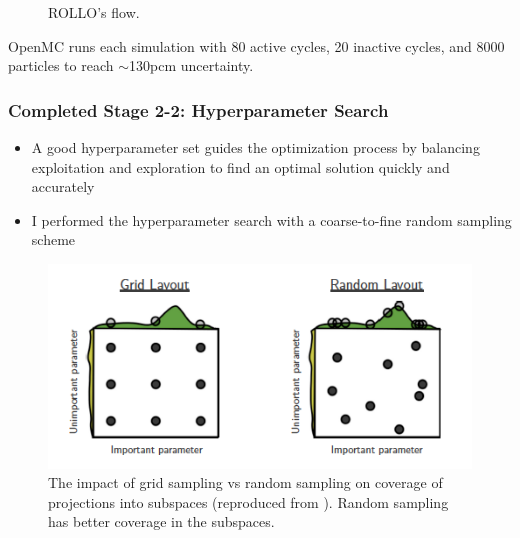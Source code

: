 \begin{frame}
\begin{minipage}[c]{0.4\textwidth}
\begin{figure}
            \caption{ROLLO's flow.}
        \end{figure}
    \end{minipage}
    \scriptsize
    OpenMC runs each simulation with 80 active cycles, 20 inactive cycles, and 
    8000 particles to reach $\sim$130pcm uncertainty.
\end{frame}

\begin{frame}
    \frametitle{Completed Stage 2-2: Hyperparameter Search}
    \begin{itemize}
        \item A good hyperparameter set guides the optimization process by 
        balancing exploitation and exploration to find an optimal solution quickly 
        and accurately
        \item I performed the hyperparameter search with a coarse-to-fine random 
        sampling scheme
    \end{itemize}
    \begin{figure}[]
        \centering
        \includegraphics[width=0.5\linewidth]{../docs/figures/random_vs_grid_sampling.png} 
        \caption{The impact of grid sampling vs random sampling on coverage of projections 
        into subspaces (reproduced from \cite{jordan_hyperparameter_2017}). 
        Random sampling has better coverage in the subspaces.}
    \end{figure}
\end{frame}

